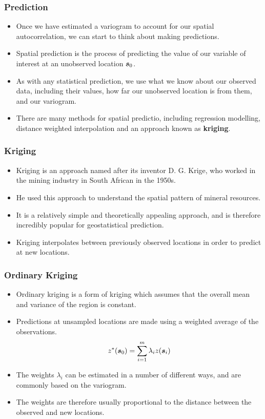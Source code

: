 \documentclass[parskip,12pt]{beamer}
\newcommand{\bd}[1]{\ensuremath{\mbox{\boldmath $#1$}}}
\begin{document}
\begin{frame}
\frametitle{Prediction}
 \begin{itemize}
\item Once we have estimated a variogram to account for our spatial autocorrelation, we can start to think about making predictions.
\vspace{3mm}
\item Spatial prediction is the process of predicting the value of our variable of interest at an unobserved location $\bd{s}_0$.
\vspace{3mm}
\item As with any statistical prediction, we use what we know about our observed data, including their values, how far our unobserved location is from them, and our variogram.
\vspace{3mm}
\item There are many methods for spatial predictio, including regression modelling, distance weighted interpolation and an approach known as \textbf{kriging}.
\end{itemize}
\end{frame}


\begin{frame}
\frametitle{Kriging}
 \begin{itemize}
\item Kriging is an approach named after its inventor D. G. Krige, who worked in the mining industry in South African in the 1950s.
\vspace{3mm}
\item He used this approach to understand the spatial pattern of mineral resources.
\vspace{3mm}
\item It is a relatively simple and theoretically appealing approach, and is therefore incredibly popular for geostatistical prediction.
\vspace{3mm}
\item Kriging interpolates between previously observed locations in order to predict at new locations. 
\end{itemize}
\end{frame}

\begin{frame}
\frametitle{Ordinary Kriging}
 \begin{itemize}
\item Ordinary kriging is a form of kriging which assumes that the overall mean and variance of the region is constant.
\vspace{3mm}
\item Predictions at unsampled locations are made using a weighted average of the observations. $$z^*(\bd{s}_0) = \sum_{i=1}^m \lambda_i z(\bd{s}_i)$$
\item The weights $\lambda_i$ can be estimated in a number of different ways, and are commonly based on the variogram.
\vspace{3mm}
\item The weights are therefore usually proportional to the distance between the observed and new locations.
\end{itemize}
\end{frame}
\end{document}
